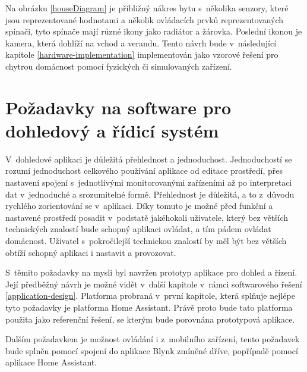 Na obrázku \ref{houseDiagram} je přibližný nákres bytu s~několika senzory, které jsou reprezentované hodnotami a několik ovládacích prvků reprezentovaných spínači, tyto spínače mají různé ikony jako radiátor a žárovka. Poslední ikonou je kamera, která dohlíží na vchod a verandu. Tento návrh bude v~následující kapitole \ref{hardware-implementation} implementován jako vzorové řešení pro chytrou domácnost pomocí fyzických či simulovaných zařízení.

\section{Požadavky na software pro dohledový a řídicí systém} \label{software-chapter-requirements}
V~dohledové aplikaci je důležitá přehlednost a jednoduchost. Jednoduchostí se rozumí jednoduchost celkového používání aplikace od editace prostředí, přes nastavení spojení s~jednotlivými monitorovanými zařízeními až po interpretaci dat v~jednoduché a srozumitelné formě. Přehlednost je důležitá, a to z~důvodu rychlého zorientování se v~aplikaci. Díky tomuto je možné před funkční a nastavené prostředí posadit v~podstatě jakéhokoli uživatele, který bez větších technických znalostí bude schopný aplikaci ovládat, a tím pádem ovládat domácnost. Uživatel s~pokročilejší technickou znalostí by měl být bez větších obtíží schopný aplikaci i nastavit a provozovat.

S~těmito požadavky na mysli byl navržen prototyp aplikace pro dohled a řízení. Její předběžný návrh je možné vidět v~další kapitole v~rámci softwarového řešení \ref{application-design}. Platforma probraná v~první kapitole, která splňuje nejlépe tyto požadavky je platforma Home Assistant. Právě proto bude tato platforma použita jako referenční řešení, se kterým bude porovnána prototypová aplikace.

Dalším požadavkem je možnost ovládání i z~mobilního zařízení, tento požadavek bude splněn pomocí spojení do aplikace Blynk zmíněné dříve, popřípadě pomocí aplikace Home Assistant.



